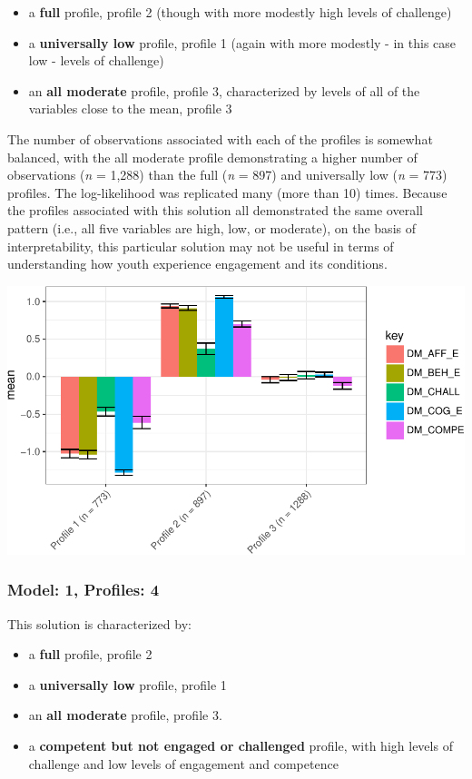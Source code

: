 \documentclass[]{book}
\providecommand{\tightlist}{%
  \setlength{\itemsep}{0pt}\setlength{\parskip}{0pt}}
\theoremstyle{definition}
\theoremstyle{definition}
\theoremstyle{definition}
\theoremstyle{remark}
\begin{document}
\begin{itemize}
\tightlist
\item
  a \textbf{full} profile, profile 2 (though with more modestly high
  levels of challenge)
\item
  a \textbf{universally low} profile, profile 1 (again with more
  modestly - in this case low - levels of challenge)
\item
  an \textbf{all moderate} profile, profile 3, characterized by levels
  of all of the variables close to the mean, profile 3
\end{itemize}

The number of observations associated with each of the profiles is
somewhat balanced, with the all moderate profile demonstrating a higher
number of observations (\emph{n} = 1,288) than the full (\emph{n} = 897)
and universally low (\emph{n} = 773) profiles. The log-likelihood was
replicated many (more than 10) times. Because the profiles associated
with this solution all demonstrated the same overall pattern (i.e., all
five variables are high, low, or moderate), on the basis of
interpretability, this particular solution may not be useful in terms of
understanding how youth experience engagement and its conditions.

\begin{center}\includegraphics[width=0.8\linewidth]{rosenberg-dissertation_files/figure-latex/m1_3p-1} \end{center}

\subsubsection{Model: 1, Profiles: 4}\label{model-1-profiles-4}

This solution is characterized by:

\begin{itemize}
\tightlist
\item
  a \textbf{full} profile, profile 2
\item
  a \textbf{universally low} profile, profile 1
\item
  an \textbf{all moderate} profile, profile 3.
\item
  a \textbf{competent but not engaged or challenged} profile, with high
  levels of challenge and low levels of engagement and competence
\end{itemize}
\end{document}
